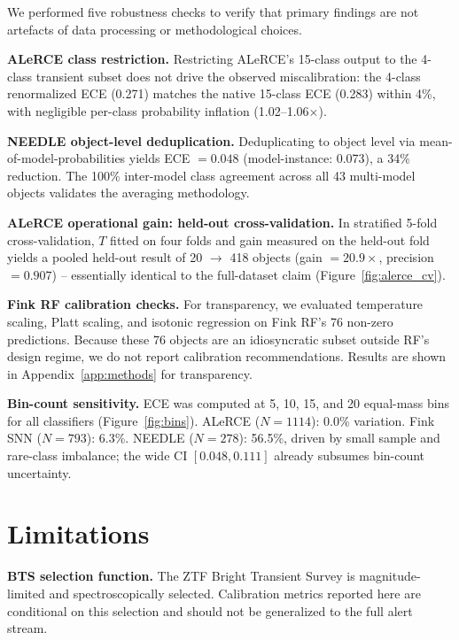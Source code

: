 \documentclass[twocolumn]{aastex631}
\begin{document}
We performed five robustness checks to verify that primary
findings are not artefacts of data processing or methodological
choices.

\textbf{ALeRCE class restriction.} Restricting ALeRCE's 15-class
output to the 4-class transient subset does not drive the observed
miscalibration: the 4-class renormalized ECE (0.271) matches the
native 15-class ECE (0.283) within 4\%, with negligible per-class
probability inflation (1.02--1.06$\times$).

\textbf{NEEDLE object-level deduplication.} Deduplicating to
object level via mean-of-model-probabilities yields ECE $= 0.048$
(model-instance: 0.073), a 34\% reduction. The 100\% inter-model
class agreement across all 43 multi-model objects validates the
averaging methodology.

\textbf{ALeRCE operational gain: held-out cross-validation.}
In stratified 5-fold cross-validation, $T$ fitted on four folds
and gain measured on the held-out fold yields a pooled held-out
result of 20 $\to$ 418 objects (gain $= 20.9\times$, precision
$= 0.907$) -- essentially identical to the full-dataset claim
(Figure~\ref{fig:alerce_cv}).

\textbf{Fink RF calibration checks.} For transparency, we
evaluated temperature scaling, Platt scaling, and isotonic
regression on Fink RF's 76 non-zero predictions. Because these
76 objects are an idiosyncratic subset outside RF's design regime,
we do not report calibration recommendations. Results are shown in
Appendix~\ref{app:methods} for transparency.

\textbf{Bin-count sensitivity.} ECE was computed at 5, 10, 15,
and 20 equal-mass bins for all classifiers
(Figure~\ref{fig:bins}). ALeRCE ($N = 1114$): 0.0\% variation.
Fink SNN ($N = 793$): 6.3\%. NEEDLE ($N = 278$): 56.5\%, driven
by small sample and rare-class imbalance; the wide CI
$[0.048, 0.111]$ already subsumes bin-count uncertainty.


\section{Limitations} \label{sec:limitations}

\textbf{BTS selection function.} The ZTF Bright Transient Survey
is magnitude-limited and spectroscopically selected. Calibration
metrics reported here are conditional on this selection and should
not be generalized to the full alert stream.
\end{document}
